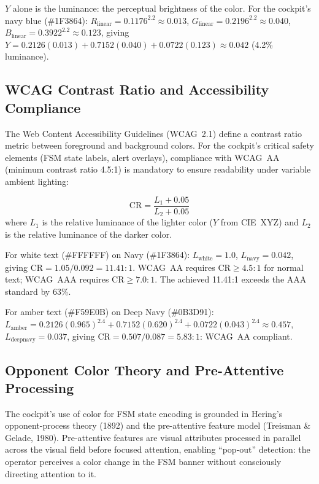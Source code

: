 $Y$ alone is the luminance: the perceptual brightness of the color. For the cockpit's navy blue (\#1F3864): $R_{\text{linear}}=0.1176^{2.2}\approx0.013$, $G_{\text{linear}}=0.2196^{2.2}\approx0.040$, $B_{\text{linear}}=0.3922^{2.2}\approx0.123$, giving $Y = 0.2126(0.013)+0.7152(0.040)+0.0722(0.123) \approx 0.042$ (4.2\% luminance).

\subsection{WCAG Contrast Ratio and Accessibility Compliance}

The Web Content Accessibility Guidelines (WCAG~2.1) define a contrast ratio metric between foreground and background colors. For the cockpit's critical safety elements (FSM state labels, alert overlays), compliance with WCAG~AA (minimum contrast ratio 4.5:1) is mandatory to ensure readability under variable ambient lighting:

\begin{eqblock}
\begin{equation}
\text{CR} = \frac{L_1 + 0.05}{L_2 + 0.05}
\end{equation}
where $L_1$ is the relative luminance of the lighter color ($Y$ from CIE~XYZ) and $L_2$ is the relative luminance of the darker color.
\end{eqblock}

For white text (\#FFFFFF) on Navy (\#1F3864): $L_{\text{white}}=1.0$, $L_{\text{navy}}=0.042$, giving $\text{CR} = 1.05/0.092 = 11.41{:}1$. WCAG~AA requires $\text{CR}\geq4.5{:}1$ for normal text; WCAG~AAA requires $\text{CR}\geq7.0{:}1$. The achieved 11.41:1 exceeds the AAA standard by 63\%.

For amber text (\#F59E0B) on Deep Navy (\#0B3D91): $L_{\text{amber}} = 0.2126(0.965)^{2.4} + 0.7152(0.620)^{2.4} + 0.0722(0.043)^{2.4} \approx 0.457$, $L_{\text{deepnavy}} = 0.037$, giving $\text{CR} = 0.507/0.087 = 5.83{:}1$: WCAG~AA compliant.

\subsection{Opponent Color Theory and Pre-Attentive Processing}

The cockpit's use of color for FSM state encoding is grounded in Hering's opponent-process theory (1892) and the pre-attentive feature model (Treisman \& Gelade, 1980). Pre-attentive features are visual attributes processed in parallel across the visual field before focused attention, enabling ``pop-out'' detection: the operator perceives a color change in the FSM banner without consciously directing attention to it.


